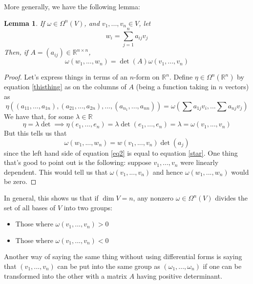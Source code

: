 \documentclass{article}
\newtheorem{lemma}{Lemma}
\newcommand{\reals}[0]{\mathbb{R}}
\begin{document}
More generally, we have the following lemma:
\begin{lemma}
  If \(\omega \in \Omega^n(V)\), and \(v_1,...,v_n \in V\), let
  \begin{equation}
    w_i = \sum_{j = 1}^na_{ij}v_j
  \end{equation}
  Then, if \(A = (a_{ij}) \in \reals^{n \times n}\),
  \begin{equation}
    \omega(w_1,...,w_n) = \det(A)\omega(v_1,...,v_n)
    \label{thisthing}
  \end{equation}
\end{lemma}
\begin{proof}
  Let's express things in terms of an \(n\)-form on \(\reals^n\). Define \(\eta \in \Omega^n(\reals^n)\) by equation \ref{thisthing} as on the columns of \(A\) (being a function taking in \(n\) vectors) as
  \begin{equation}
    \eta((a_{11},...,a_{1n}),(a_{21},...,a_{2n}),...,(a_{n_1},...,a_{nn})) = \omega\left(\sum a_{1j}v_i, ... \sum a_{nj}v_j\right)
    \label{star}
  \end{equation}
  We have that, for some \(\lambda \in \reals\)
  \begin{equation}
    \eta = \lambda\det \implies \eta(e_1,...,e_n) = \lambda \det(e_1,...,e_n) = \lambda = \omega(v_1,...,v_n)
  \end{equation}
  But this tells us that
  \begin{equation}
    \omega(w_1,...,w_n) = w(v_1,...,v_n)\det(a_j)
    \label{eq2}
  \end{equation}
  since the left hand side of equation \ref{eq2} is equal to equation \ref{star}. One thing that's good to point out is the following: suppose \(v_1,...,v_n\) were linearly dependent. This would tell us that \(\omega(v_1,...,v_n)\) and hence \(\omega(w_1,...,w_n)\) would be zero.
\end{proof}
In general, this shows us that if \(\dim V = n\), any nonzero \(\omega \in \Omega^n(V)\) divides the set of all bases of \(V\) into two groups:
\begin{itemize}
  \item Those where \(\omega(v_1,...,v_n) > 0\)
  \item Those where \(\omega(v_1,...,v_n) < 0\)
\end{itemize}
Another way of saying the same thing without using differential forms is saying that \((v_1,...,v_n)\) can be put into the same group as \((\omega_1,...,\omega_n)\) if one can be transformed into the other with a matrix \(A\) having positive determinant.
\end{document}
